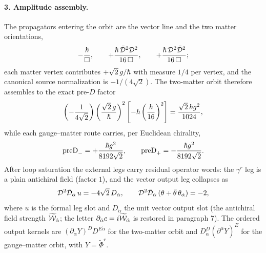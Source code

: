 \paragraph{3. Amplitude assembly.} The propagators entering the orbit are the vector line and the two matter
orientations,
\begin{equation}\label{eq:bg:props}
-\frac{\hbar}{\Box}, \qquad +\frac{\hbar\,\bar{\mathcal{D}}^{2}\mathcal{D}^{2}}{16\,\Box}, \qquad +\frac{\hbar\,\mathcal{D}^{2}\bar{\mathcal{D}}^{2}}{16\,\Box} ;
\end{equation}
each matter vertex contributes $+\sqrt2\,g/\hbar$ with measure $1/4$ per vertex, and the canonical source
normalization is $-1/(4\sqrt2)$. The two-matter orbit therefore assembles to the exact pre-$D$ factor
\begin{equation}\label{eq:bg:tmmpre}
\left(-\frac{1}{4\sqrt2}\right)\left(\frac{\sqrt2\,g}{\hbar}\right)^{2} \left[-\hbar\left(\frac{\hbar}{16}\right)^{2}\right]=\frac{\sqrt2\,\hbar g^{2}}{1024} ,
\end{equation}
while each gauge--matter route carries, per Euclidean chirality,
\begin{equation}\label{eq:bg:tmpre}
\mathrm{preD}_{-}=+\frac{\hbar g^{2}}{8192\sqrt2}, \qquad \mathrm{preD}_{+}=-\frac{\hbar g^{2}}{8192\sqrt2} .
\end{equation}
After loop saturation the external legs carry residual operator words: the $\gamma^{r}$ leg is a plain antichiral
field (factor $1$), and the vector output leg collapses as
\begin{equation}\label{eq:bg:residual}
\mathcal{D}^{2}\bar{\mathcal{D}}_{\dot\alpha}\,u=-4\sqrt2\,D_{\dot\alpha}, \qquad \mathcal{D}^{2}\bar{\mathcal{D}}_{\dot\alpha}\,(\theta+\bar\theta\,\theta_{\dot\alpha})=-2 ,
\end{equation}
where $u$ is the formal leg slot and $D_{\dot\alpha}$ the unit vector output slot (the antichiral field strength
$\widetilde{\mathcal{W}}_{\dot\alpha}$; the letter $\partial_{\dot\alpha}c=i\widetilde{\mathcal{W}}_{\dot\alpha}$ is restored in paragraph 7). The
ordered output kernels are $(\partial_{\dot\alpha}Y)^{D}D^{E\dot\alpha}$ for the two-matter orbit and
$D_{\dot\alpha}^{D}(\partial^{\dot\alpha}Y)^{E}$ for the gauge--matter orbit, with $Y=\widetilde\Phi^{r}$.

